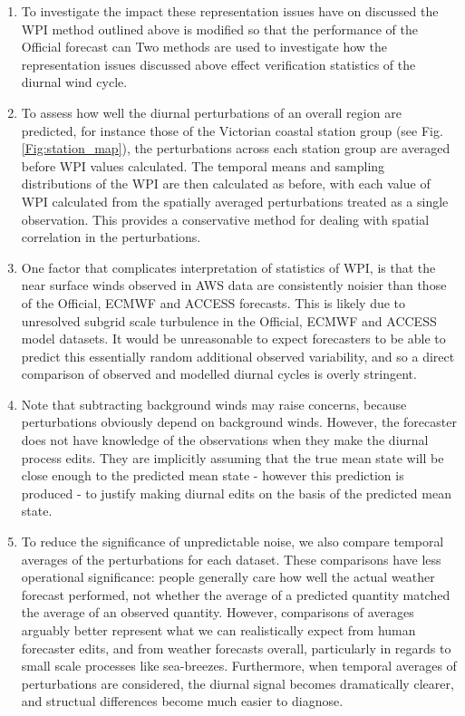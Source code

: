 \documentclass{article}
\begin{document}
\begin{enumerate}
\item
To investigate the impact these representation issues have on  discussed the WPI method outlined above is modified so that the performance of the Official forecast can    Two methods are used to investigate how the representation issues discussed above effect verification statistics of the diurnal wind cycle.   
\item
To assess how well the diurnal perturbations of an overall region are predicted, for instance those of the Victorian coastal station group (see Fig. \ref{Fig:station_map}), the perturbations across each station group are averaged before WPI values calculated. The temporal means and sampling distributions of the WPI are then calculated as before, with each value of WPI calculated from the spatially averaged perturbations treated as a single observation. This provides a conservative method for dealing with spatial correlation in the perturbations.        
\item
One factor that complicates interpretation of statistics of WPI, is that the near surface winds observed in AWS data are consistently noisier than those of the Official, ECMWF and ACCESS forecasts. This is likely due to unresolved subgrid scale turbulence in the Official, ECMWF and ACCESS model datasets. It would be unreasonable to expect forecasters to be able to predict this essentially random additional observed variability, and so a direct comparison of observed and modelled diurnal cycles is overly stringent. 
\item
Note that subtracting background winds may raise concerns, because perturbations obviously depend on background winds. However, the forecaster does not have knowledge of the observations when they make the diurnal process edits. They are implicitly assuming that the true mean state will be close enough to the predicted mean state - however this prediction is produced - to justify making diurnal edits on the basis of the predicted mean state.
\item
To reduce the significance of unpredictable noise, we also compare temporal averages of the perturbations for each dataset. These comparisons have less operational significance: people generally care how well the actual weather forecast performed, not whether the average of a predicted quantity matched the average of an observed quantity. However, comparisons of averages arguably better represent what we can realistically expect from human forecaster edits, and from weather forecasts overall, particularly in regards to small scale processes like sea-breezes. Furthermore, when temporal averages of perturbations are considered, the diurnal signal becomes dramatically clearer, and structual differences become much easier to diagnose. 

\end{enumerate}
\end{document}
